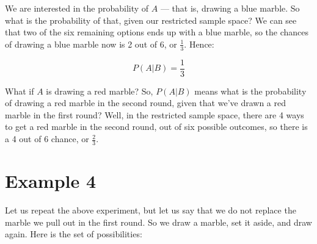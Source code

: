 \documentclass[../../../main.tex]{subfiles}
\begin{document}
We are interested in the probability of $A$ --- that is, drawing a blue marble. So what is the probability of that, given our restricted sample space? We can see that two of the six remaining options ends up with a blue marble, so the chances of drawing a blue marble now is 2 out of 6, or $\frac{1}{3}$. Hence:

\begin{equation*}
  P(A | B) = \frac{1}{3}
\end{equation*}

What if $A$ is drawing a red marble? So, $P(A | B)$ means what is the probability of drawing a red marble in the second round, given that we've drawn a red marble in the first round? Well, in the restricted sample space, there are 4 ways to get a red marble in the second round, out of six possible outcomes, so there is a 4 out of 6 chance, or $\frac{2}{3}$. 


\section{Example 4}

Let us repeat the above experiment, but let us say that we do not replace the marble we pull out in the first round. So we draw a marble, set it aside, and draw again. Here is the set of possibilities:

\begin{center}
\end{center}
\end{document}
